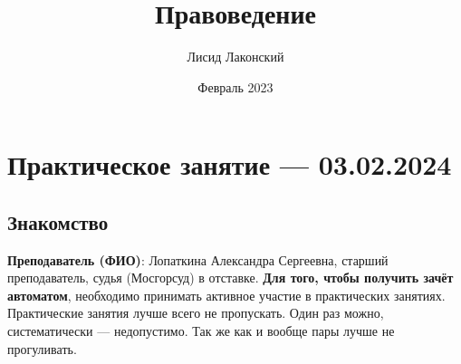\documentclass{article}
\title{Правоведение}
\author{Лисид Лаконский}
\date{Февраль 2023}
\begin{document}
\raggedright

\maketitle

\tableofcontents
\pagebreak

\section{Практическое занятие — 03.02.2024}

\subsection{Знакомство}

\textbf{Преподаватель (ФИО)}: Лопаткина Александра Сергеевна, старший преподаватель, судья (Мосгорсуд) в отставке. \textbf{Для того, чтобы получить зачёт автоматом}, необходимо принимать активное участие в практических занятиях. Практические занятия лучше всего не пропускать. Один раз можно, систематически — недопустимо. Так же как и вообще пары лучше не прогуливать.
\end{document}
